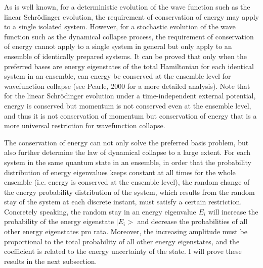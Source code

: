 As is well known, for a deterministic evolution of the wave function such as the linear Schr\"{o}dinger evolution, the requirement of conservation of energy may apply to a single isolated system. However, for a stochastic evolution of the wave function such as the dynamical collapse process, the requirement of conservation of energy cannot apply to a single system in general but only apply  to an ensemble of identically prepared systems.  %
 It can be proved that only when the preferred bases are energy eigenstates of the total Hamiltonian for each identical system in an ensemble, can energy be conserved at the ensemble level for wavefunction collapse (see Pearle, 2000 for a more detailed analysis). Note that for the linear Schr\"{o}dinger evolution under a time-independent external potential, energy is conserved but momentum is not conserved even at the ensemble level, and thus it is not conservation of momentum but conservation of energy that is a more universal restriction for wavefunction collapse.

The conservation of energy can not only solve the preferred basis problem, but also further determine the law of dynamical collapse to a large extent.
For each system in the same quantum state in an ensemble, in order that the probability distribution of energy eigenvalues keeps constant at all times for the whole ensemble (i.e. energy is conserved at the ensemble level), the random change of the  energy probability distribution of the system, which results from the random stay of the system at each discrete instant, must satisfy a certain restriction. Concretely speaking, the random stay in an energy eigenvalue $E_i$ will increase the probability of the energy eigenstate $|E_i>$ and decrease the probabilities of all other energy eigenstates pro rata. Moreover, the increasing amplitude must be proportional to the total probability of all other energy eigenstates, and the coefficient is related to the energy uncertainty of the state. 
I will prove these results in the next subsection.


